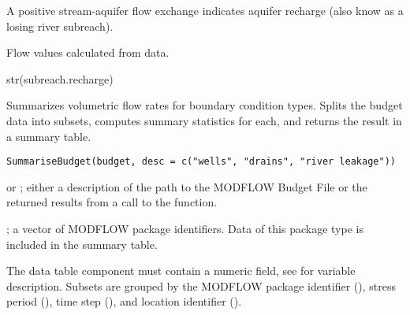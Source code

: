 \documentclass[letterpaper]{book}
\begin{document}
%
\begin{Details}\relax
A positive stream-aquifer flow exchange indicates aquifer recharge (also know as a losing river subreach).
\end{Details}
%
\begin{Source}\relax
Flow values calculated from  data.
\end{Source}
%
\begin{Examples}
\begin{ExampleCode}
str(subreach.recharge)
\end{ExampleCode}
\end{Examples}
%
\begin{Description}\relax
Summarizes volumetric flow rates for boundary condition types.
Splits the budget data into subsets, computes summary statistics for each, and returns the result in a summary table.
\end{Description}
%
\begin{Usage}
\begin{verbatim}
SummariseBudget(budget, desc = c("wells", "drains", "river leakage"))
\end{verbatim}
\end{Usage}
%
\begin{Arguments}
\begin{ldescription}
\item[\code{budget}]  or ; either a description of the path to the MODFLOW Budget File or the returned results from a call to the  function.
\item[\code{desc}] ; a vector of MODFLOW package identifiers.
Data of this package type is included in the summary table.
\end{ldescription}
\end{Arguments}
%
\begin{Details}\relax
The  data table component must contain a numeric  field, see  for variable description.
Subsets are grouped by the MODFLOW package identifier (), stress period (), time step (), and location identifier ().
\end{Details}
%
\end{document}
